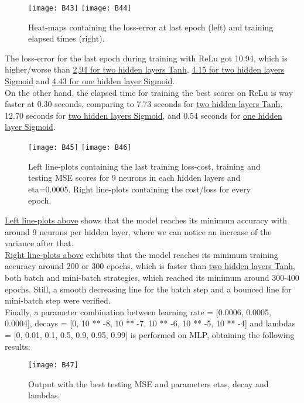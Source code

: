 \begin{figure}[H]
\label{fig:B28}
\centering
\texttt{[image: B43]}
\texttt{[image: B44]}
\caption{Heat-maps containing the loss-error at last epoch (left) and training elapsed times (right).}
\end{figure}

The loss-error for the last epoch during training with ReLu got 10.94, which is higher/worse than \hyperref[fig:B21]{2,94 for two hidden layers Tanh}, \hyperref[fig:B13]{4.15 for two hidden layers Sigmoid} and \hyperref[fig:B4]{4.43 for one hidden layer Sigmoid}.\\

On the other hand, the elapsed time for training the best scores on ReLu is way faster at 0.30 seconds, comparing to 7.73 seconds for \hyperref[fig:B21]{two hidden layers Tanh}, 12.70 seconds for \hyperref[fig:B13]{two hidden layers Sigmoid}, and 0.54 seconds for \hyperref[fig:B4]{one hidden layer Sigmoid}.

\begin{figure}[H]
\label{fig:B29}
\centering
\texttt{[image: B45]}
\texttt{[image: B46]}
\caption{Left line-plots containing the last training loss-cost, training and testing MSE scores for 9 neurons in each hidden layers and eta=0.0005. Right line-plots containing the cost/loss for every epoch.}
\end{figure}

\hyperref[fig:B29]{Left line-plots above} shows that the model reaches its minimum accuracy with around 9 neurons per hidden layer, where we can notice an increase of the variance after that.\\

\hyperref[fig:B29]{Right line-plots above} exhibits that the model reaches its minimum training accuracy around 200 or 300 epochs, which is faster than \hyperref[fig:B22]{two hidden layers Tanh}, both batch and mini-batch strategies, which reached its minimum around 300-400 epochs. Still, a smooth decreasing line for the batch step and a bounced line for mini-batch step were verified.\\

Finally, a parameter combination between learning rate = [0.0006, 0.0005, 0.0004], decays = [0, 10 ** -8, 10 ** -7, 10 ** -6, 10 ** -5, 10 ** -4] and lambdas = [0, 0.01, 0.1, 0.5, 0.9, 0.95, 0.99] is performed on MLP, obtaining the following results:

\begin{figure}[H]
\label{fig:B30}
\centering
\texttt{[image: B47]}
\caption{Output with the best testing MSE and parameters etas, decay and lambdas.}
\end{figure}

